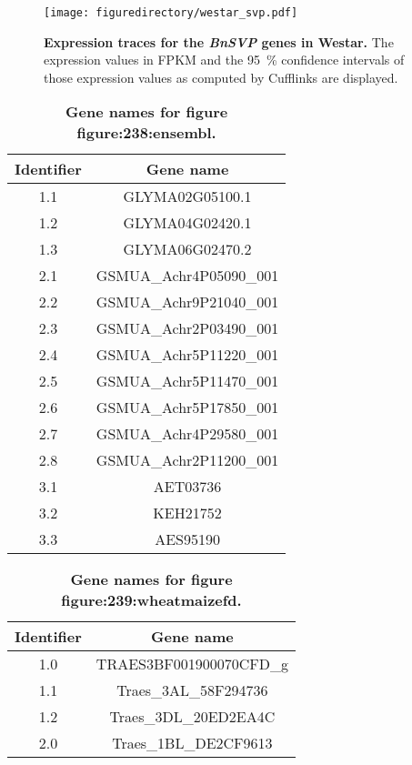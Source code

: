 \documentclass[12pt,]{book}
\begin{document}
\begin{figure}[htbp]
\centering
\texttt{[image: figuredirectory/westar\_svp.pdf]}
\caption{\textbf{Expression traces for the \emph{BnSVP} genes in
Westar.} The expression values in FPKM and the 95~\% confidence
intervals of those expression values as computed by Cufflinks are
displayed.}\label{appendixa:svp}
\end{figure}

\begin{table}[htp]
\caption{\textbf{Gene names for figure figure:238:ensembl.}}
\label{appendix:figure238table}
\begin{center}
\begin{tabular}{cc}
\toprule
Identifier & Gene name \\
\midrule
1.1 & GLYMA02G05100.1       \\
1.2 & GLYMA04G02420.1       \\
1.3 & GLYMA06G02470.2       \\
2.1 & GSMUA\_Achr4P05090\_001 \\
2.2 & GSMUA\_Achr9P21040\_001 \\
2.3 & GSMUA\_Achr2P03490\_001 \\
2.4 & GSMUA\_Achr5P11220\_001 \\
2.5 & GSMUA\_Achr5P11470\_001 \\
2.6 & GSMUA\_Achr5P17850\_001 \\
2.7 & GSMUA\_Achr4P29580\_001 \\
2.8 & GSMUA\_Achr2P11200\_001 \\
3.1 & AET03736              \\
3.2 & KEH21752              \\
3.3 & AES95190              \\
\bottomrule
\end{tabular}
\end{center}
\end{table}\begin{table}[htp]
\caption{\textbf{Gene names for figure figure:239:wheatmaizefd.}}
\label{appendix:figure239wheatmaizefd}
\begin{center}
\begin{tabular}{cc}
\toprule
Identifier & Gene name \\
\midrule
1.0  & TRAES3BF001900070CFD\_g \\
1.1  & Traes\_3AL\_58F294736    \\
1.2  & Traes\_3DL\_20ED2EA4C    \\
2.0  & Traes\_1BL\_DE2CF9613    \\

\end{tabular}
\end{center}
\end{table}
\end{document}
